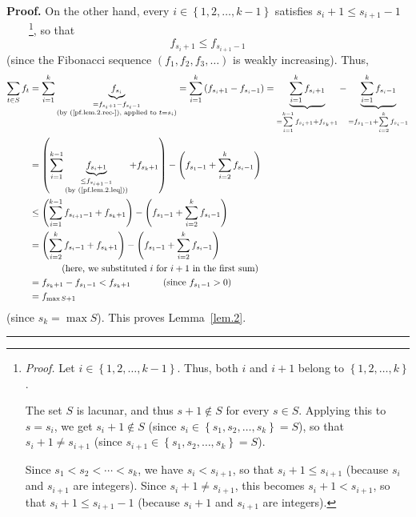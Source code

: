 \documentclass[numbers=enddot,12pt,final,onecolumn,notitlepage]{scrartcl}%
\numberwithin{exer}{section}
\theoremstyle{definition}
\newenvironment{proof}[1][Proof]{\noindent\textbf{#1.} }{\ \rule{0.5em}{0.5em}}
\let\sumnonlimits\sum
\renewcommand{\sum}{\sumnonlimits\limits}
\begin{document}
\begin{proof}
On the other hand, every $i\in\left\{  1,2,\ldots,k-1\right\}  $ satisfies
$s_{i}+1\leq s_{i+1}-1$\ \ \ \ \footnote{\textit{Proof.} Let $i\in\left\{
1,2,\ldots,k-1\right\}  $. Thus, both $i$ and $i+1$ belong to $\left\{
1,2,\ldots,k\right\}  $.
\par
The set $S$ is lacunar, and thus $s+1\notin S$ for every $s\in S$. Applying
this to $s=s_{i}$, we get $s_{i}+1\notin S$ (since $s_{i}\in\left\{
s_{1},s_{2},\ldots,s_{k}\right\}  =S$), so that $s_{i}+1\neq s_{i+1}$ (since
$s_{i+1}\in\left\{  s_{1},s_{2},\ldots,s_{k}\right\}  =S$).
\par
Since $s_{1}<s_{2}<\cdots<s_{k}$, we have $s_{i}<s_{i+1}$, so that
$s_{i}+1\leq s_{i+1}$ (because $s_{i}$ and $s_{i+1}$ are integers). Since
$s_{i}+1\neq s_{i+1}$, this becomes $s_{i}+1<s_{i+1}$, so that $s_{i}+1\leq
s_{i+1}-1$ (because $s_{i}+1$ and $s_{i+1}$ are integers).}, so that
\begin{equation}
f_{s_{i}+1}\leq f_{s_{i+1}-1} \label{pf.lem.2.leq}%
\end{equation}
(since the Fibonacci sequence $\left(  f_{1},f_{2},f_{3},\ldots\right)  $ is
weakly increasing). Thus,%
\begin{align*}
\sum\limits_{t\in S}f_{t}  &  =\sum\limits_{i=1}^{k}\underbrace{f_{s_{i}}%
}_{\substack{=f_{s_{i}+1}-f_{s_{i}-1}\\\text{(by (\ref{pf.lem.2.rec-}),
applied to }t=s_{i}\text{)}}}=\sum\limits_{i=1}^{k}\left(  f_{s_{i}%
+1}-f_{s_{i}-1}\right)  =\underbrace{\sum\limits_{i=1}^{k}f_{s_{i}+1}}%
_{=\sum\limits_{i=1}^{k-1}f_{s_{i}+1}+f_{s_{k}+1}}-\underbrace{\sum
\limits_{i=1}^{k}f_{s_{i}-1}}_{=f_{s_{1}-1}+\sum\limits_{i=2}^{k}f_{s_{i}-1}%
}\\
&  =\left(  \sum\limits_{i=1}^{k-1}\underbrace{f_{s_{i}+1}}_{\substack{\leq
f_{s_{i+1}-1}\\\text{(by (\ref{pf.lem.2.leq}))}}}+f_{s_{k}+1}\right)  -\left(
f_{s_{1}-1}+\sum\limits_{i=2}^{k}f_{s_{i}-1}\right) \\
&  \leq\left(  \sum\limits_{i=1}^{k-1}f_{s_{i+1}-1}+f_{s_{k}+1}\right)
-\left(  f_{s_{1}-1}+\sum\limits_{i=2}^{k}f_{s_{i}-1}\right) \\
&  =\left(  \sum\limits_{i=2}^{k}f_{s_{i}-1}+f_{s_{k}+1}\right)  -\left(
f_{s_{1}-1}+\sum\limits_{i=2}^{k}f_{s_{i}-1}\right) \\
&  \ \ \ \ \ \ \ \ \ \ \left(  \text{here, we substituted }i\text{ for
}i+1\text{ in the first sum}\right) \\
&  =f_{s_{k}+1}-f_{s_{1}-1}<f_{s_{k}+1}\ \ \ \ \ \ \ \ \ \ \left(  \text{since
}f_{s_{1}-1}>0\right) \\
&  =f_{\max S+1}%
\end{align*}
(since $s_{k}=\max S$). This proves Lemma~\ref{lem.2}.
\end{proof}
\end{document}
